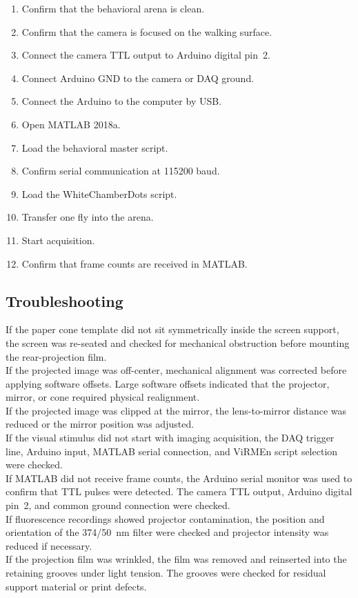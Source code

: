 \begin{enumerate}
    \item Confirm that the behavioral arena is clean.
    \item Confirm that the camera is focused on the walking surface.
    \item Connect the camera TTL output to Arduino digital pin~2.
    \item Connect Arduino GND to the camera or DAQ ground.
    \item Connect the Arduino to the computer by USB.
    \item Open MATLAB 2018a.
    \item Load the behavioral master script.
    \item Confirm serial communication at 115200 baud.
    \item Load the WhiteChamberDots script.
    \item Transfer one fly into the arena.
    \item Start acquisition.
    \item Confirm that frame counts are received in MATLAB.
\end{enumerate}

\subsection{Troubleshooting}

If the paper cone template did not sit symmetrically inside the screen support, the screen was re-seated and checked for mechanical obstruction before mounting the rear-projection film.\\

If the projected image was off-center, mechanical alignment was corrected before applying software offsets. Large software offsets indicated that the projector, mirror, or cone required physical realignment.\\

If the projected image was clipped at the mirror, the lens-to-mirror distance was reduced or the mirror position was adjusted.\\

If the visual stimulus did not start with imaging acquisition, the DAQ trigger line, Arduino input, MATLAB serial connection, and ViRMEn script selection were checked.\\

If MATLAB did not receive frame counts, the Arduino serial monitor was used to confirm that TTL pulses were detected. The camera TTL output, Arduino digital pin~2, and common ground connection were checked.\\

If fluorescence recordings showed projector contamination, the position and orientation of the 374/50~nm filter were checked and projector intensity was reduced if necessary.\\

If the projection film was wrinkled, the film was removed and reinserted into the retaining grooves under light tension. The grooves were checked for residual support material or print defects.\\
